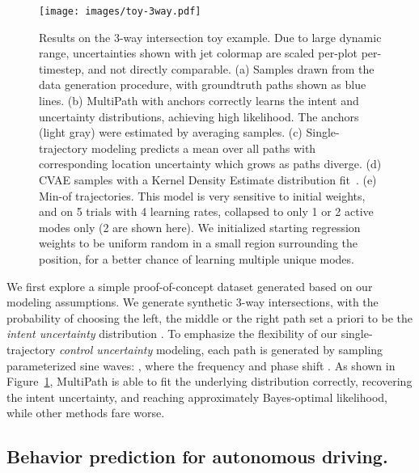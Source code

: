 \documentclass{article}
\newcommand{\multiflow}{MultiPath\xspace}
\begin{document}
\begin{figure}[!tbp]
\centering
\texttt{[image: images/toy-3way.pdf]}
\caption{\small Results on the 3-way intersection toy example. Due to large dynamic range, uncertainties shown with jet colormap are scaled per-plot per-timestep, and not directly comparable. (a) Samples drawn from the data generation procedure, with groundtruth paths shown as blue lines. (b) \multiflow with  anchors correctly learns the intent and uncertainty distributions, achieving high likelihood. The anchors (light gray) were estimated by averaging  samples. (c) Single-trajectory modeling predicts a mean over all paths with corresponding location uncertainty which grows as paths diverge. (d) CVAE samples with a Kernel Density Estimate distribution fit~\cite{Bishop06}. (e) Min-of  trajectories.  This model is very sensitive to initial weights, and on 5 trials with 4 learning rates, collapsed to only 1 or 2 active modes only (2 are shown here).  We initialized starting regression weights to be uniform random in a small region surrounding the  position, for a better chance of learning multiple unique modes.
\vspace{-0.2cm}}
\label{fig:toy-3way}
\end{figure}

We first explore a simple proof-of-concept dataset generated based on our modeling assumptions.  We generate synthetic 3-way intersections, with the probability of choosing the left, the middle or the right path set a priori to be the {\em intent uncertainty} distribution  . To emphasize the flexibility of our single-trajectory {\em control uncertainty} modeling, each path is generated by sampling parameterized sine waves: , where the frequency  and phase shift .  As shown in Figure~\ref{fig:toy-3way}, \multiflow is able to fit the underlying distribution correctly, recovering the intent uncertainty, and reaching approximately Bayes-optimal likelihood, while other methods fare worse.



\subsection{Behavior prediction for autonomous driving.}
\label{sec:bp}
\end{document}
